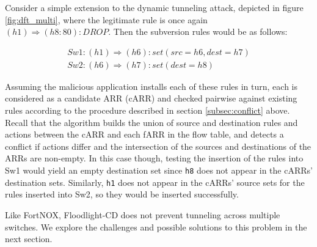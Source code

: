 Consider a simple extension to the dynamic tunneling attack, depicted in figure \ref{fig:dft_multi}, where the legitimate rule is once again $(h1) \Rightarrow (h8:80): DROP$. 
Then the subversion rules would be as follows: 

\begin{align}
  Sw1: (h1) \Rightarrow (h6): set(src=h6, dest=h7) \\
  Sw2: (h6) \Rightarrow (h7): set(dest=h8)
\end{align}

Assuming the malicious application installs each of these rules in turn, each is considered as a candidate ARR (cARR) and checked pairwise against existing rules according to the procedure described in section \ref{subsec:conflict} above. 
Recall that the algorithm builds the union of source and destination rules and actions between the cARR and each fARR in the flow table, and detects a conflict if actions differ and the intersection of the sources and destinations of the ARRs are non-empty. 
In this case though, testing the insertion of the rules into Sw1 would yield an empty destination set since \texttt{h8} does not appear in the cARRs' destination sets. 
Similarly, \texttt{h1} does not appear in the cARRs' source sets for the rules inserted into Sw2, so they would be inserted successfully. 

Like FortNOX, Floodlight-CD does not prevent tunneling across multiple switches.
We explore the challenges and possible solutions to this problem in the next section.



